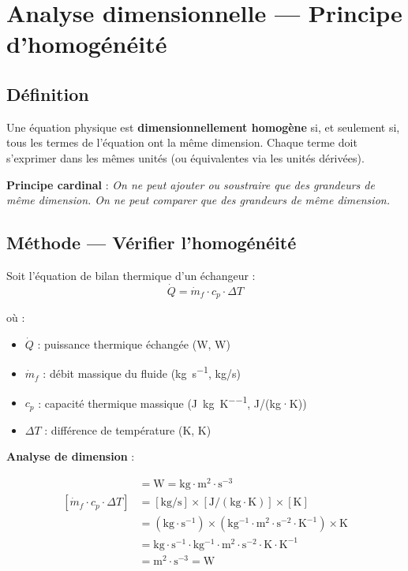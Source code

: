 \section{Analyse dimensionnelle — Principe d'homogénéité}

\subsection{Définition}

\begin{definition}
  Une équation physique est \textbf{dimensionnellement homogène} si, et seulement si, tous
  les termes de l'équation ont la même dimension. Chaque terme doit s'exprimer dans les mêmes
  unités (ou équivalentes via les unités dérivées).
\end{definition}

\textbf{Principe cardinal} : \emph{On ne peut ajouter ou soustraire que des grandeurs de même
dimension. On ne peut comparer que des grandeurs de même dimension.}

\subsection{Méthode — Vérifier l'homogénéité}

Soit l'équation de bilan thermique d'un échangeur :
\begin{equation}
  \dot{Q} = \dot{m}_f \cdot c_p \cdot \Delta T
  \label{eq:bilan-thermal}
\end{equation}

où :
\begin{itemize}
  \item $\dot{Q}$ : puissance thermique échangée (\si{\watt}, W)
  \item $\dot{m}_f$ : débit massique du fluide (\si{\kilogram\per\second}, kg/s)
  \item $c_p$ : capacité thermique massique (\si{\joule\per\kilogram\per\kelvin}, J/(kg·K))
  \item $\Delta T$ : différence de température (\si{\kelvin}, K)
\end{itemize}

\vspace{0.5cm}

\textbf{Analyse de dimension} :

\begin{align*}
  [\dot{Q}] &= \mathrm{W} = \mathrm{kg \cdot m^2 \cdot s^{-3}} \\
  [\dot{m}_f \cdot c_p \cdot \Delta T] &= [\mathrm{kg/s}] \times [\mathrm{J/(kg \cdot K)}] \times [
  \mathrm{K}] \\
  &= \mathrm{(kg \cdot s^{-1})} \times \mathrm{(kg^{-1} \cdot m^2 \cdot s^{-2} \cdot K^{-1})} \times
  \mathrm{K} \\
  &= \mathrm{kg \cdot s^{-1} \cdot kg^{-1} \cdot m^2 \cdot s^{-2} \cdot K \cdot K^{-1}} \\
  &= \mathrm{m^2 \cdot s^{-3}} = \mathrm{W}
\end{align*}

